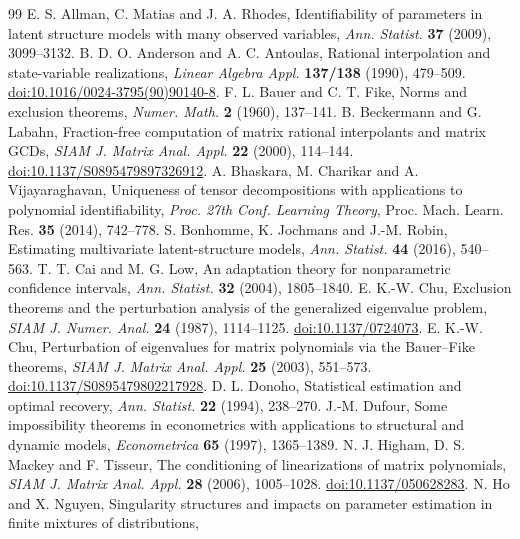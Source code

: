 \begin{thebibliography}{99}
 E. S. Allman, C. Matias and J. A. Rhodes,
Identifiability of parameters in latent structure models with many
observed variables, \emph{Ann. Statist.} \textbf{37} (2009), 3099--3132.
 B. D. O. Anderson and A. C. Antoulas,
Rational interpolation and state-variable realizations,
\emph{Linear Algebra Appl.} \textbf{137/138} (1990), 479--509.
\href{https://doi.org/10.1016/0024-3795(90)90140-8}{doi:10.1016/0024-3795(90)90140-8}.
 F. L. Bauer and C. T. Fike,
Norms and exclusion theorems, \emph{Numer. Math.} \textbf{2} (1960), 137--141.
 B. Beckermann and G. Labahn,
Fraction-free computation of matrix rational interpolants and matrix GCDs,
\emph{SIAM J. Matrix Anal. Appl.} \textbf{22} (2000), 114--144.
\href{https://doi.org/10.1137/S0895479897326912}{doi:10.1137/S0895479897326912}.
 A. Bhaskara, M. Charikar and A. Vijayaraghavan,
Uniqueness of tensor decompositions with applications to polynomial
identifiability, \emph{Proc. 27th Conf. Learning Theory},
Proc. Mach. Learn. Res. \textbf{35} (2014), 742--778.
 S. Bonhomme, K. Jochmans and J.-M. Robin,
Estimating multivariate latent-structure models,
\emph{Ann. Statist.} \textbf{44} (2016), 540--563.
 T. T. Cai and M. G. Low,
An adaptation theory for nonparametric confidence intervals,
\emph{Ann. Statist.} \textbf{32} (2004), 1805--1840.
 E. K.-W. Chu,
Exclusion theorems and the perturbation analysis of the generalized
eigenvalue problem, \emph{SIAM J. Numer. Anal.} \textbf{24} (1987),
1114--1125. \href{https://doi.org/10.1137/0724073}{doi:10.1137/0724073}.
 E. K.-W. Chu,
Perturbation of eigenvalues for matrix polynomials via the Bauer--Fike
theorems, \emph{SIAM J. Matrix Anal. Appl.} \textbf{25} (2003), 551--573.
\href{https://doi.org/10.1137/S0895479802217928}{doi:10.1137/S0895479802217928}.
 D. L. Donoho, Statistical estimation and optimal recovery,
\emph{Ann. Statist.} \textbf{22} (1994), 238--270.
 J.-M. Dufour, Some impossibility theorems in econometrics
with applications to structural and dynamic models,
\emph{Econometrica} \textbf{65} (1997), 1365--1389.
 N. J. Higham, D. S. Mackey and F. Tisseur,
The conditioning of linearizations of matrix polynomials,
\emph{SIAM J. Matrix Anal. Appl.} \textbf{28} (2006), 1005--1028.
\href{https://doi.org/10.1137/050628283}{doi:10.1137/050628283}.
 N. Ho and X. Nguyen, Singularity structures and impacts on
parameter estimation in finite mixtures of distributions,

\end{thebibliography}
